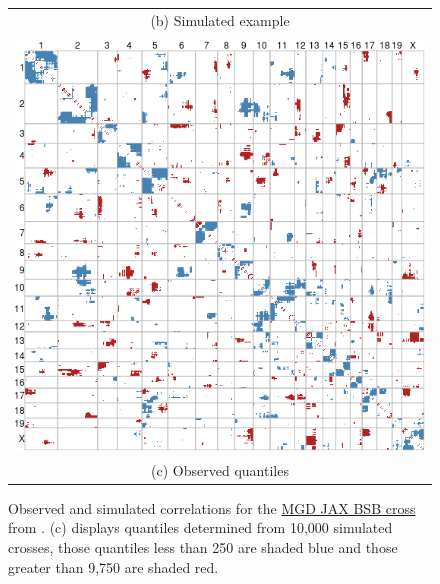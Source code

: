 \documentclass[sts]{imsart}
\begin{document}
\begin{figure}[h!]
\begin{center}
\begin{tabular}{c}
      {\footnotesize (b) Simulated example} \\
      \\
      \includegraphics[scale = 0.3]{../img/jaxbsb_quant.png} \\
      {\footnotesize (c) Observed quantiles} \\                            
    \end{tabular}
  \end{center}
  \caption{Observed and simulated correlations for the \href{http://www.informatics.jax.org/downloads/reports/MGI_JAX_BSB_Panel.rpt}{MGD JAX BSB cross} from \cite{roweetal1994jaxbsb}. (c) displays quantiles determined from 10,000 simulated crosses, those quantiles less than 250 are shaded blue and those greater than 9,750 are shaded red.}
  \label{fig:jaxbsb}
\end{figure}
\end{document}
